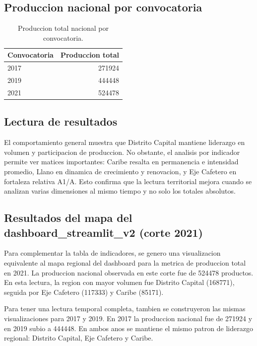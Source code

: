 \documentclass[12pt,letterpaper]{article}
\begin{document}
\subsection{Produccion nacional por convocatoria}

\begin{table}[H]
\centering
\begin{tabular}{lr}
\toprule
\textbf{Convocatoria} & \textbf{Produccion total} \\
\midrule
2017 & 271924 \\
2019 & 444448 \\
2021 & 524478 \\
\bottomrule
\end{tabular}
\caption{Produccion total nacional por convocatoria.}
\end{table}

\subsection{Lectura de resultados}

El comportamiento general muestra que Distrito Capital mantiene liderazgo en volumen y participacion de produccion. No obstante, el analisis por indicador permite ver matices importantes: Caribe resalta en permanencia e intensidad promedio, Llano en dinamica de crecimiento y renovacion, y Eje Cafetero en fortaleza relativa A1/A. Esto confirma que la lectura territorial mejora cuando se analizan varias dimensiones al mismo tiempo y no solo los totales absolutos.

\subsection{Resultados del mapa del dashboard\_streamlit\_v2 (corte 2021)}

Para complementar la tabla de indicadores, se genero una visualizacion equivalente al mapa regional del dashboard para la metrica de produccion total en 2021. La produccion nacional observada en este corte fue de 524478 productos. En esta lectura, la region con mayor volumen fue Distrito Capital (168771), seguida por Eje Cafetero (117333) y Caribe (85171).

Para tener una lectura temporal completa, tambien se construyeron las mismas visualizaciones para 2017 y 2019. En 2017 la produccion nacional fue de 271924 y en 2019 subio a 444448. En ambos anos se mantiene el mismo patron de liderazgo regional: Distrito Capital, Eje Cafetero y Caribe.
\end{document}
